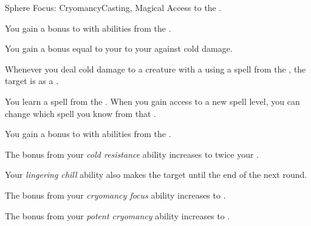     \begin{feat}{Sphere Focus: Cryomancy}{Casting, Magical}
        \featpre Access to the  .

         You gain a  bonus to  with abilities from the  .

         You gain a bonus equal to your  to your  against cold damage.

         Whenever you deal cold damage to a creature with a  using a spell from the  , the target is  as a .

         You learn a spell from the  .
        When you gain access to a new spell level, you can change which spell you know from that .

         You gain a  bonus to  with abilities from the  .

         The bonus from your \textit{cold resistance} ability increases to twice your .

         Your \textit{lingering chill} ability also makes the target  until the end of the next round.

         The bonus from your \textit{cryomancy focus} ability increases to .

         The bonus from your \textit{potent cryomancy} ability increases to .
    \end{feat}

